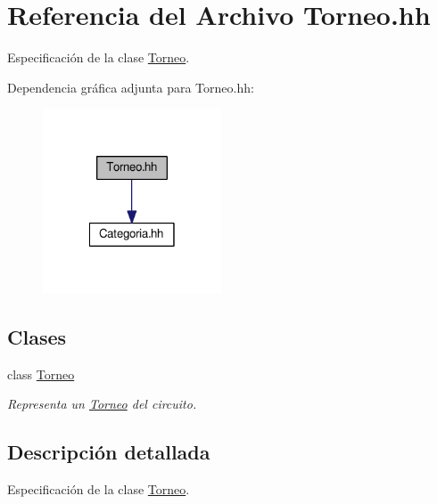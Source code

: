 \hypertarget{_torneo_8hh}{}\section{Referencia del Archivo Torneo.\+hh}
\label{_torneo_8hh}


Especificación de la clase \mbox{\hyperlink{class_torneo}{Torneo}}.  


Dependencia gráfica adjunta para Torneo.\+hh\+:\nopagebreak
\begin{figure}[H]
\begin{center}
\leavevmode
\includegraphics[width=150pt]{_torneo_8hh__incl}
\end{center}
\end{figure}
\subsection*{Clases}
\begin{DoxyCompactItemize}
\item 
class \mbox{\hyperlink{class_torneo}{Torneo}}
\begin{DoxyCompactList}\small\item\em Representa un \mbox{\hyperlink{class_torneo}{Torneo}} del circuito. \end{DoxyCompactList}\end{DoxyCompactItemize}


\subsection{Descripción detallada}
Especificación de la clase \mbox{\hyperlink{class_torneo}{Torneo}}. 

